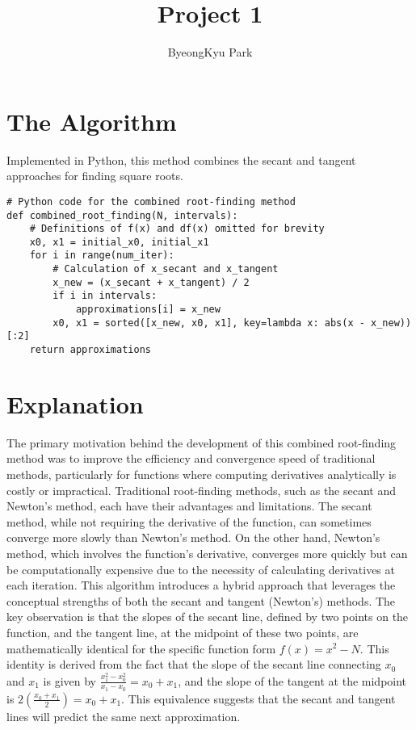 \documentclass[10pt]{article}
\begin{document}
    
\title{Project 1}
\date{}
\author{ByeongKyu Park}

\maketitle

\section*{The Algorithm}

Implemented in Python, this method combines the secant and tangent approaches for finding square roots.


\begin{Verbatim}
# Python code for the combined root-finding method
def combined_root_finding(N, intervals):
    # Definitions of f(x) and df(x) omitted for brevity
    x0, x1 = initial_x0, initial_x1
    for i in range(num_iter):
        # Calculation of x_secant and x_tangent
        x_new = (x_secant + x_tangent) / 2
        if i in intervals:
            approximations[i] = x_new
        x0, x1 = sorted([x_new, x0, x1], key=lambda x: abs(x - x_new))[:2]
    return approximations
\end{Verbatim}

\section*{Explanation}

The primary motivation behind the development of this combined root-finding method was to improve the efficiency and convergence speed of traditional methods, particularly for functions where computing derivatives analytically is costly or impractical. Traditional root-finding methods, such as the secant and Newton's method, each have their advantages and limitations. The secant method, while not requiring the derivative of the function, can sometimes converge more slowly than Newton's method. On the other hand, Newton's method, which involves the function's derivative, converges more quickly but can be computationally expensive due to the necessity of calculating derivatives at each iteration. 
This algorithm introduces a hybrid approach that leverages the conceptual strengths of both the secant and tangent (Newton's) methods. The key observation is that the slopes of the secant line, defined by two points on the function, and the tangent line, at the midpoint of these two points, are mathematically identical for the specific function form \(f(x) = x^2 - N\). This identity is derived from the fact that the slope of the secant line connecting \(x_0\) and \(x_1\) is given by \(\frac{x_1^2 - x_0^2}{x_1 - x_0} = x_0 + x_1\), and the slope of the tangent at the midpoint is \(2\left(\frac{x_0 + x_1}{2}\right) = x_0 + x_1\). This equivalence suggests that the secant and tangent lines will predict the same next approximation.
\end{document}
